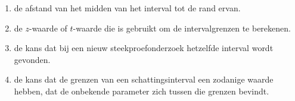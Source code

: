 \begin{enumerate}[label=(\alph*)]
    \item de afstand van het midden van het interval tot de rand ervan.
    \item de $z$-waarde of $t$-waarde die is gebruikt om de intervalgrenzen te berekenen.
    \item de kans dat bij een nieuw steekproefonderzoek hetzelfde interval wordt gevonden.
    \item de kans dat de grenzen van een schattingsinterval een zodanige waarde hebben, dat de onbekende parameter zich tussen die grenzen bevindt.
\end{enumerate}
